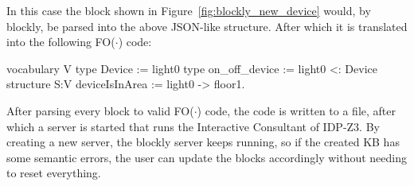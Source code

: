 \documentclass[11pt,a4paper]{report}
\newcommand{\fodot}{FO($\cdot$)\xspace}
\begin{document}
In this case the block shown in Figure~\ref{fig:blockly_new_device} would, by blockly, be parsed into the above JSON-like structure. After which it is translated into the following \fodot code:

\begin{idplisting}
vocabulary V {
    type Device := {light0}
    type on_off_device := {light0} <: Device
}
structure S:V {
    deviceIsInArea := {light0 -> floor1}.
}
\end{idplisting}

After parsing every block to valid \fodot code, the code is written to a file, after which a server is started that runs the Interactive Consultant of IDP-Z3. By creating a new server, the blockly server keeps running, so if the created KB has some semantic errors, the user can update the blocks accordingly without needing to reset everything. 
\printbibliography
\end{document}
